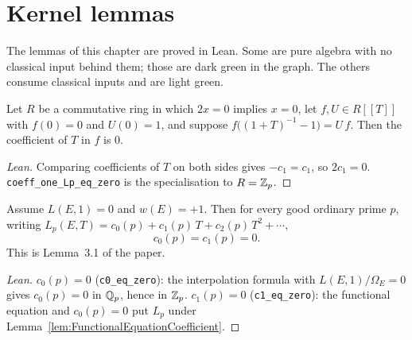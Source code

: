 \chapter{Kernel lemmas}
\label{ch:kernel}

The lemmas of this chapter are proved in Lean. Some are pure algebra with no
classical input behind them; those are dark green in the graph. The others
consume classical inputs and are light green.

\begin{lemma}
  \label{lem:FunctionalEquationCoefficient}
  \leanok
  Let $R$ be a commutative ring in which $2x = 0$ implies $x = 0$, let
  $f, U \in R[[T]]$ with $f(0) = 0$ and $U(0) = 1$, and suppose
  $f\bigl((1+T)^{-1} - 1\bigr) = U\,f$. Then the coefficient of $T$ in $f$ is
  $0$.
\end{lemma}
\begin{proof}[Lean]
  \leanok
  Comparing coefficients of $T$ on both sides gives $-c_1 = c_1$, so
  $2c_1 = 0$. \texttt{coeff\_one\_Lp\_eq\_zero} is the specialisation to
  $R = \mathbb{Z}_p$.
\end{proof}

\begin{lemma}
  \label{lem:VanishingC0C1}
  \leanok
  Assume $L(E,1) = 0$ and $w(E) = +1$. Then for every good ordinary prime
  $p$, writing $L_p(E,T) = c_0(p) + c_1(p)\,T + c_2(p)\,T^2 + \cdots$,
  \[
    c_0(p) = c_1(p) = 0 .
  \]
  This is Lemma~3.1 of the paper.
\end{lemma}
\begin{proof}[Lean]
  \leanok
  $c_0(p) = 0$ (\texttt{c0\_eq\_zero}): the interpolation formula with
  $L(E,1)/\Omega_E = 0$ gives $c_0(p) = 0$ in $\mathbb{Q}_p$, hence in $\mathbb{Z}_p$.
  $c_1(p) = 0$ (\texttt{c1\_eq\_zero}): the functional equation and
  $c_0(p) = 0$ put $L_p$ under
  Lemma~\ref{lem:FunctionalEquationCoefficient}.
\end{proof}

